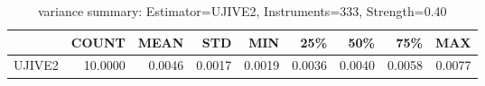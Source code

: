 \begin{table}[ht]
\centering
\caption{variance summary: Estimator=UJIVE2, Instruments=333, Strength=0.40}
\begin{tabular}{lrrrrrrrr}
\toprule
 & COUNT & MEAN & STD & MIN & 25\% & 50\% & 75\% & MAX \\
\midrule
UJIVE2 & 10.0000 & 0.0046 & 0.0017 & 0.0019 & 0.0036 & 0.0040 & 0.0058 & 0.0077 \\
\bottomrule
\end{tabular}
\end{table}
